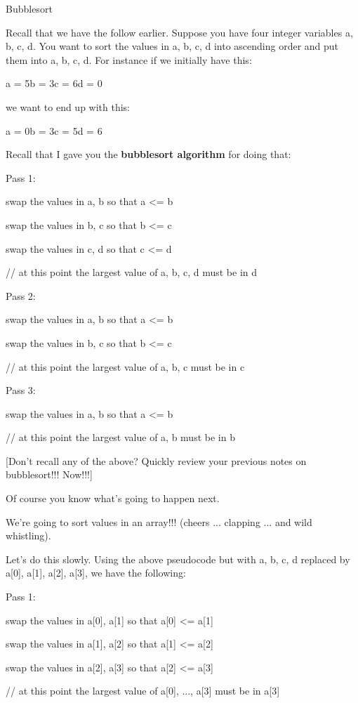 \documentclass[
]{article}
\begin{document}
Bubblesort

Recall that we have the follow earlier. Suppose you have four integer
variables a, b, c, d. You want to sort the values in a, b, c, d into
ascending order and put them into a, b, c, d. For instance if we
initially have this:

a = 5b = 3c = 6d = 0

we want to end up with this:

a = 0b = 3c = 5d = 6

Recall that I gave you the \textbf{bubblesort algorithm} for doing that:

Pass 1:

swap the values in a, b so that a \textless= b

swap the values in b, c so that b \textless= c

swap the values in c, d so that c \textless= d

// at this point the largest value of a, b, c, d must be in d

Pass 2:

swap the values in a, b so that a \textless= b

swap the values in b, c so that b \textless= c

// at this point the largest value of a, b, c must be in c

Pass 3:

swap the values in a, b so that a \textless= b

// at this point the largest value of a, b must be in b

{[}Don't recall any of the above? Quickly review your previous notes on
bubblesort!!! Now!!!{]}

Of course you know what's going to happen next.

We're going to sort values in an array!!! (cheers ... clapping ... and
wild whistling).

Let's do this slowly. Using the above pseudocode but with a, b, c, d
replaced by a{[}0{]}, a{[}1{]}, a{[}2{]}, a{[}3{]}, we have the
following:

Pass 1:

swap the values in a{[}0{]}, a{[}1{]} so that a{[}0{]} \textless=
a{[}1{]}

swap the values in a{[}1{]}, a{[}2{]} so that a{[}1{]} \textless=
a{[}2{]}

swap the values in a{[}2{]}, a{[}3{]} so that a{[}2{]} \textless=
a{[}3{]}

// at this point the largest value of a{[}0{]}, ..., a{[}3{]} must be in
a{[}3{]}
\end{document}
